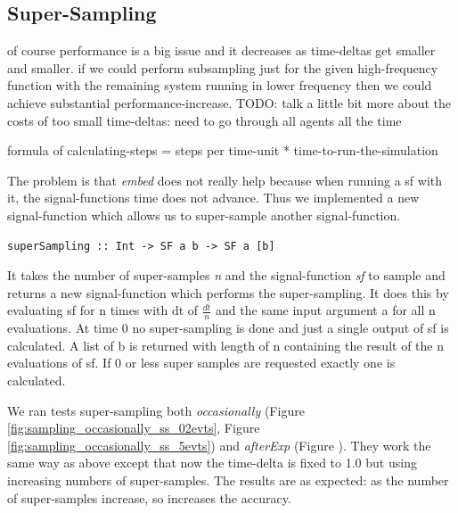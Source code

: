 \subsection{Super-Sampling}
of course performance is a big issue and it decreases as time-deltas get smaller and smaller. if we could perform subsampling just for the given high-frequency function with the remaining system running in lower frequency then we could achieve substantial performance-increase.
TODO: talk a little bit more about the costs of too small time-deltas: need to go through all agents all the time

formula of calculating-steps = steps per time-unit * time-to-run-the-simulation

The problem is that \textit{embed} does not really help because when running a sf with it, the signal-functions time does not advance. Thus we implemented a new signal-function which allows us to super-sample another signal-function.

\begin{verbatim}
superSampling :: Int -> SF a b -> SF a [b]
\end{verbatim}

It takes the number of super-samples \textit{n} and the signal-function \textit{sf} to sample and returns a new signal-function which performs the super-sampling. It does this by evaluating sf for n times with dt of $\frac{dt}{n}$ and the same input argument a for all n evaluations. At time 0 no super-sampling is done and just a single output of sf is calculated. A list of b is returned with length of n containing the result of the n evaluations of sf. If 0 or less super samples are requested exactly one is calculated.

We ran tests super-sampling both \textit{occasionally} (Figure \ref{fig:sampling_occasionally_ss_02evts}, Figure \ref{fig:sampling_occasionally_ss_5evts}) and \textit{afterExp} (Figure ). They work the same way as above except that now the time-delta is fixed to 1.0 but using increasing numbers of super-samples. The results are as expected: as the number of super-samples increase, so increases the accuracy.

